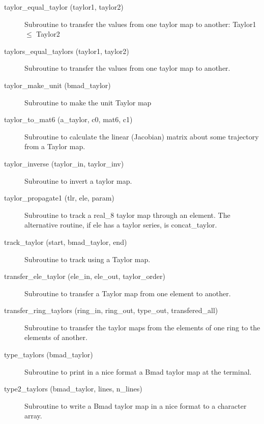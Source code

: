 \begin{description}
\item[taylor\_equal\_taylor (taylor1, taylor2)] \Newline
Subroutine to transfer the values from one taylor map to another:
Taylor1 $\le$ Taylor2

\item[taylors\_equal\_taylors (taylor1, taylor2)] \Newline 
Subroutine to transfer the values from one taylor map to another.

\item[taylor\_make\_unit (bmad\_taylor)] \Newline
Subroutine to make the unit Taylor map

\item[taylor\_to\_mat6 (a\_taylor, c0, mat6, c1)] \Newline
Subroutine to calculate the linear (Jacobian) matrix about some
trajectory from a Taylor map.

\item[taylor\_inverse (taylor\_in, taylor\_inv)] \Newline
Subroutine to invert a taylor map. 

\item[taylor\_propagate1 (tlr, ele, param)] \Newline
Subroutine to track a real\_8 taylor map through an element. 
The alternative routine, if ele has a taylor series, is concat\_taylor. 

\item[track\_taylor (start, bmad\_taylor, end)] \Newline
Subroutine to track using a Taylor map. 

\item[transfer\_ele\_taylor (ele\_in, ele\_out, taylor\_order)] \Newline 
Subroutine to transfer a Taylor map from one element to another.

\item[transfer\_ring\_taylors (ring\_in, ring\_out, 
                                             type\_out, transfered\_all) ] \Newline 
Subroutine to transfer the taylor maps from the elements of one ring to
the elements of another. 

\item[type\_taylors (bmad\_taylor)] \Newline
Subroutine to print in a nice format a Bmad taylor map at the terminal. 

\item[type2\_taylors (bmad\_taylor, lines, n\_lines)] \Newline
Subroutine to write a Bmad taylor map in a nice format to a character array. 

\end{description}

